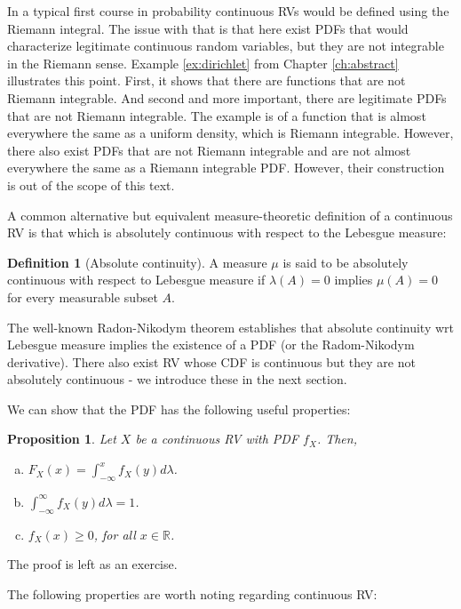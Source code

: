 \documentclass{book}
\theoremstyle{plain}%
\newtheorem{proposition}{Proposition}[section]
\theoremstyle{definition}
\newtheorem{definition}{Definition}[section]
\begin{document}
In a typical first course in probability continuous RVs would be defined using the Riemann integral. The issue with that is that here exist PDFs that would characterize legitimate continuous random variables, but they are not integrable in the Riemann sense. Example \ref{ex:dirichlet} from Chapter \ref{ch:abstract} illustrates this point. First, it shows that there are functions that are not Riemann integrable. And second and more important, there are legitimate PDFs that are not Riemann integrable. The example is of a function that is almost everywhere the same as a uniform density, which is Riemann integrable. However, there also exist PDFs that are not Riemann integrable and are not almost everywhere the same as a Riemann integrable PDF. However, their construction is out of the scope of this text.

A common alternative but equivalent measure-theoretic definition of a continuous RV is that which is absolutely continuous with respect to the Lebesgue measure:

\begin{definition}[Absolute continuity]
A measure $\mu$ is said to be absolutely continuous with respect to Lebesgue measure if $\lambda(A) = 0$ implies $\mu(A) = 0$ for every measurable subset $A$.
\end{definition}

The well-known Radon-Nikodym theorem establishes that absolute continuity wrt Lebesgue measure implies the existence of a PDF (or the Radom-Nikodym derivative). There also exist RV whose CDF is continuous but they are not absolutely continuous - we introduce these in the next section.

We can show that the PDF has the following useful properties:

\begin{proposition}
Let $X$ be a continuous RV with PDF $f_X$. Then,
\begin{enumerate}[(a)]
\item $F_X(x) = \int_{-\infty}^x f_X(y)d\lambda$.
\item $\int_{-\infty}^\infty f_X(y)d\lambda = 1$.
\item $f_X(x) \geq 0$, for all $x \in \mathbb{R}$.
\end{enumerate}\label{prop:pdf}
\end{proposition}

The proof is left as an exercise.

The following properties are worth noting regarding continuous RV:
\end{document}
